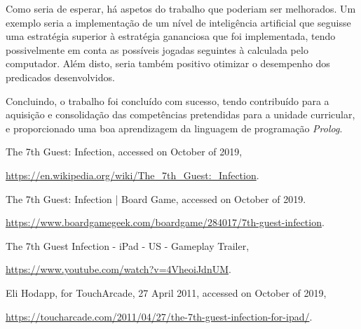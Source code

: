 \documentclass[a4paper]{article}
\begin{document}
\bigskip
Como seria de esperar, há aspetos do trabalho que poderiam ser melhorados. Um exemplo seria a implementação de um nível de inteligência artificial que seguisse uma estratégia superior à estratégia gananciosa que foi implementada, tendo possivelmente em conta as possíveis jogadas seguintes à calculada pelo computador. Além disto, seria também positivo otimizar o desempenho dos predicados desenvolvidos.

\bigskip
Concluindo, o trabalho foi concluído com sucesso, tendo contribuído para a aquisição e consolidação das competências pretendidas para a unidade curricular, e proporcionado uma boa aprendizagem da linguagem de programação \textit{Prolog}.

\newpage
\begin{thebibliography}{}

    The 7th Guest: Infection,
    accessed on October of 2019,
    
    \url{https://en.wikipedia.org/wiki/The_7th_Guest:_Infection}.

    The 7th Guest: Infection | Board Game,
    accessed on October of 2019.
    
    \url{https://www.boardgamegeek.com/boardgame/284017/7th-guest-infection}.

    The 7th Guest Infection - iPad - US - Gameplay Trailer,
    
    \url{https://www.youtube.com/watch?v=4VheoiJdnUM}.
    
    Eli Hodapp, for TouchArcade,
    27 April 2011,
    accessed on October of 2019,
    
    \url{https://toucharcade.com/2011/04/27/the-7th-guest-infection-for-ipad/}.

\end{thebibliography}
\end{document}
